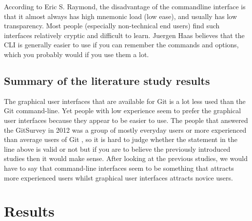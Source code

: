 \documentclass[a4paper,oneside]{bth} %
\begin{document}
			According to Eric S. Raymond, the disadvantage of the commandline interface is that it almost always has high mnemonic load (low ease), and usually has low transparency. Most people (especially non-technical end users) find such interfaces relatively cryptic and difficult to learn. \cite{ArtOfUnixProgramming}
			Juergen Haas believes that the CLI is generally easier to use if you can remember the commands and options, which you probably would if you use them a lot. \cite{LinuxGuiVsCli}
			
			
			\section{Summary of the literature study results}
			The graphical user interfaces that are available for Git is a lot less used than the Git command-line. Yet people with low experience seem to prefer the graphical user interfaces because they appear to be easier to use. The people that answered the GitSurvey in 2012 was a group of mostly everyday users or more experienced than average users of Git \cite{GitUserSurvey}, so it is hard to judge whether the statement in the line above is valid or not but if you are to believe the previously introduced studies then it would make sense. After looking at the previous studies, we would have to say that command-line interfaces seem to be something that attracts more experienced users whilst graphical user interfaces attracts novice users.
		
		\chapter{Results}
\end{document}
